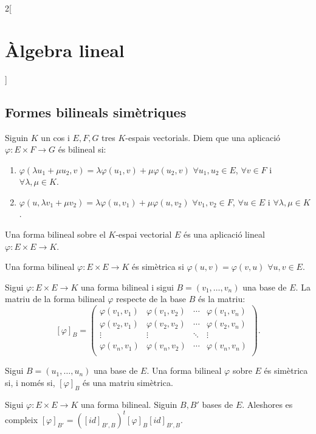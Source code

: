\documentclass[class=article,10pt,crop=false]{standalone}
\begin{document}
\begin{multicols}{2}[\section{Àlgebra lineal}]
\subsection{Formes bilineals simètriques}
\begin{definition}
Siguin $K$ un cos i $E,F,G$ tres $K$-espais vectorials. Diem que una aplicació $\varphi:E\times F\rightarrow G$ és bilineal si:
\begin{enumerate}
    \item $\varphi(\lambda u_1+\mu u_2,v)=\lambda \varphi(u_1,v)+\mu \varphi(u_2,v)$ $\forall u_1,u_2\in E$, $\forall v\in F$ i $\forall\lambda,\mu\in K$.
    \item $\varphi(u,\lambda v_1+\mu v_2)=\lambda \varphi(u,v_1)+\mu \varphi(u,v_2)$ $\forall v_1,v_2\in F$, $\forall u\in E$ i $\forall\lambda,\mu\in K$.
\end{enumerate}
\end{definition}
\begin{definition}
Una forma bilineal sobre el $K$-espai vectorial $E$ és una aplicació lineal $\varphi:E\times E\rightarrow K$.
\end{definition}
\begin{definition}
Una forma bilineal $\varphi:E\times E\rightarrow K$ és simètrica si $\varphi(u,v)=\varphi(v,u)$ $\forall u,v\in E$.
\end{definition}
\begin{definition}
Sigui $\varphi:E\times E\rightarrow K$ una forma bilineal i sigui $B=(v_1,\ldots,v_n)$ una base de $E$. La matriu de la forma bilineal $\varphi$ respecte de la base $B$ és la matriu: $$[\varphi]_B=\begin{pmatrix}
\varphi(v_1,v_1) & \varphi(v_1,v_2) & \cdots & \varphi(v_1,v_n) \\
\varphi(v_2,v_1) & \varphi(v_2,v_2) & \cdots & \varphi(v_2,v_n) \\
\vdots & \vdots & \ddots & \vdots \\
\varphi(v_n,v_1) & \varphi(v_n,v_2) & \cdots & \varphi(v_n,v_n) \\
\end{pmatrix}.$$ 
\end{definition}
\begin{prop}
Sigui $B=(u_1,\ldots,u_n)$ una base de $E$. Una forma bilineal $\varphi$ sobre $E$ és simètrica si, i només si, $[\varphi]_B$ és una matriu simètrica.
\end{prop}
\begin{prop}
Sigui $\varphi:E\times E\rightarrow K$ una forma bilineal. Siguin $B,B'$ bases de $E$. Aleshores es compleix $[\varphi]_{B'}=([id]_{B',B})^t[\varphi]_B[id]_{B',B}$.

\end{prop}
\end{multicols}
\end{document}
